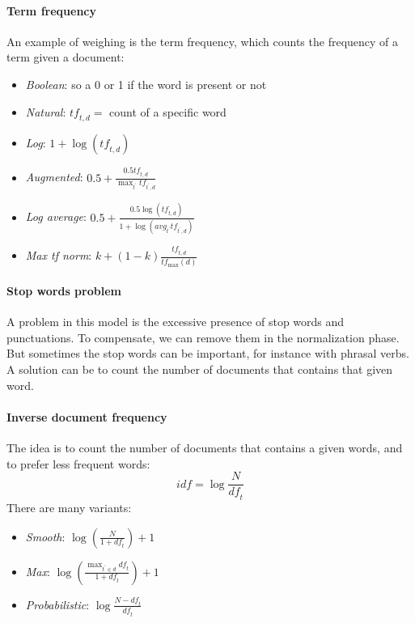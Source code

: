 \paragraph{Term frequency}
An example of weighing is the term frequency, 
which counts the frequency of a term given a document:
\begin{itemize}
    \item \emph{Boolean}: so a 0 or 1 if the word is present or not
    \item \emph{Natural}: $\mathit{tf}_{t,d} = $  count of a specific word
    \item \emph{Log}: $1 + \log(\mathit{tf}_{t,d})$
    \item \emph{Augmented}: $0.5 + \frac{0.5\mathit{tf}_{t,d}}{\max_{t^\prime} \mathit{tf}_{t^\prime,d}}$
    \item \emph{Log average}:  $0.5 + \frac{0.5 \log(\mathit{tf}_{t,d})}{1 + \log(\mathit{avg}_{t^\prime} \mathit{tf}_{t^\prime,d})}$
    \item \emph{Max tf norm}: $k + (1-k)\frac{\mathit{tf}_{t,d}}{\mathit{tf}_{\max}(d)}$
\end{itemize}

\paragraph{Stop words problem}
A problem in this model is the excessive presence of stop words and punctuations.
To compensate, we can remove them in the normalization phase. \\
But sometimes the stop words can be important, for instance with phrasal verbs.
A solution can be to count the number of documents that contains that given word.

\paragraph{Inverse document frequency}
The idea is to count the number of documents that contains a 
given words, and to prefer less frequent words: $$\mathit{idf} = \log\frac{N}{\mathit{df}_t}$$
There are many variants: 
\begin{itemize}
    \item \emph{Smooth}: $\log(\frac{N}{1 + \mathit{df}_t}) + 1$
    \item \emph{Max}: $\log(\frac{\max_{t^\prime \in d} \mathit{df}_t}{1 + \mathit{df}_t}) + 1$
    \item \emph{Probabilistic}: $\log \frac{N - \mathit{df}_t}{\mathit{df}_t}$
\end{itemize}

